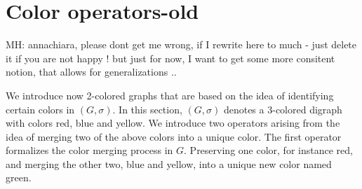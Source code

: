 \documentclass[final,3p,times]{elsarticle}
\newcommand{\TODO}[1]{\begingroup\color{red}#1\endgroup}
\newcommand{\OLD}[1]{\begingroup\tiny\color{gray}#1\endgroup}
\newcommand{\mh}[1]{\begingroup\color{blue}#1\endgroup}
\begin{document}
\clearpage
\section{Color operators-old}
\TODO{MH: annachiara, please dont get me wrong, if I rewrite here to much - just delete it if you are not 
happy ! but just for now, I want to get some more consitent notion, that allows for generalizations .. }


\mh{
We introduce now 2-colored graphs that are based on the idea of identifying certain colors in  $(G,\sigma)$.
}
\OLD{In this section, $(G,\sigma)$ denotes a 3-colored digraph with colors red, blue and yellow. 
We introduce two operators arising from the idea of merging two of the above colors into a unique color. The first operator formalizes the color merging process in $G$. Preserving one color, for instance red, and merging the other two, blue and yellow, into a unique new color named green.}
\end{document}
